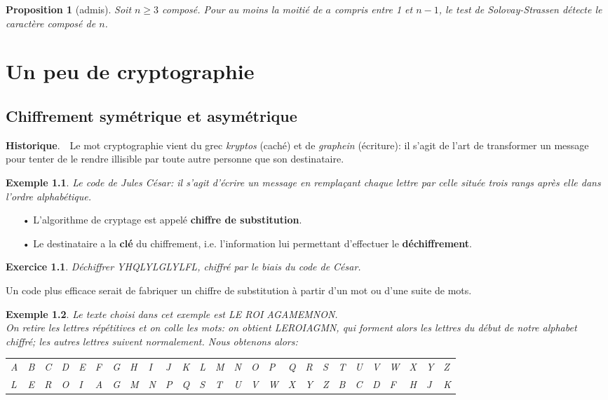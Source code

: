 \documentclass[10pt,a4paper]{report}
\newtheorem*{ex}{Exemple}
\newtheorem*{exo}{Exercice}
\newtheorem{Prop}[thm]{Proposition}
\begin{document}
\begin{Prop}[admis]
Soit $n \geqslant 3$ composé. Pour au moins la moitié de $a$ compris entre 1 et $n-1$, le test de Solovay-Strassen détecte le caractère composé de $n$.
\end{Prop}

\chapter{Un peu de cryptographie}


\section{Chiffrement symétrique et asymétrique}


{\textbf{Historique}}.\ \ Le mot cryptographie vient du grec \textit{kryptos} (caché) et de \textit{graphein} (écriture): il s'agit de l'art de transformer un message pour tenter de le rendre illisible par toute autre personne que son destinataire.

\begin{ex}
Le code de Jules César: il s'agit d'écrire un message en remplaçant chaque lettre par celle située trois rangs après elle dans l'ordre alphabétique.
\end{ex}

\begin{itemize}
\item[•] L'algorithme de cryptage est appelé \textbf{chiffre de substitution}.
\item[•] Le destinataire a la \textbf{clé} du chiffrement, i.e. l'information lui permettant d'effectuer le \textbf{déchiffrement}.
\end{itemize}


\begin{exo}
Déchiffrer YHQLYLGLYLFL, chiffré par le biais du code de César.
\end{exo}

Un code plus efficace serait de fabriquer un chiffre de substitution à partir d'un mot ou d'une suite de mots.

\begin{ex}
Le texte choisi dans cet exemple est LE ROI AGAMEMNON.\\
On retire les lettres répétitives et on colle les mots: on obtient LEROIAGMN, qui forment alors les lettres du début de notre alphabet chiffré; les autres lettres suivent normalement. Nous obtenons alors:
  
\begin{tabular}{p{0.1cm}p{0.1cm}p{0.1cm}p{0.1cm}p{0.1cm}p{0.1cm}p{0.1cm}p{0.1cm}p{0.1cm}p{0.1cm}p{0.1cm}p{0.1cm}p{0.1cm}p{0.1cm}p{0.1cm}p{0.1cm}p{0.1cm}p{0.1cm}p{0.1cm}p{0.1cm}p{0.1cm}p{0.1cm}p{0.1cm}p{0.1cm}p{0.1cm}p{0.1cm}}
 A & B & C & D & E & F & G & H & I & J & K & L & M & N &O &P & Q & R & S & T & U & V & W & X & Y & Z   \\
L & E & R & O & I & A & G & M & N & P & Q  & S & T & U & V & W & X & Y & Z & B & C & D & F & H & J & K 
\end{tabular}\\  
\end{ex}
 
\end{document}
